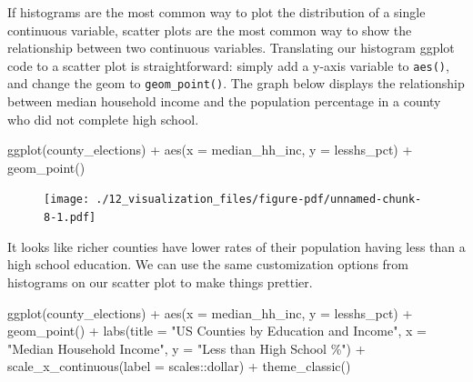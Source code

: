 \documentclass[
  letterpaper,
]{book}
\newenvironment{Shaded}{\begin{snugshade}}{\end{snugshade}}
\newcommand{\AttributeTok}[1]{\textcolor[rgb]{0.40,0.45,0.13}{#1}}
\newcommand{\FunctionTok}[1]{\textcolor[rgb]{0.28,0.35,0.67}{#1}}
\newcommand{\NormalTok}[1]{\textcolor[rgb]{0.00,0.23,0.31}{#1}}
\newcommand{\SpecialCharTok}[1]{\textcolor[rgb]{0.37,0.37,0.37}{#1}}
\newcommand{\StringTok}[1]{\textcolor[rgb]{0.13,0.47,0.30}{#1}}
\theoremstyle{definition}
\theoremstyle{definition}
\theoremstyle{plain}
\theoremstyle{definition}
\theoremstyle{plain}
\theoremstyle{plain}
\theoremstyle{remark}
\begin{document}
If histograms are the most common way to plot the distribution of a
single continuous variable, scatter plots are the most common way to
show the relationship between two continuous variables. Translating our
histogram ggplot code to a scatter plot is straightforward: simply add a
y-axis variable to \texttt{aes()}, and change the geom to
\texttt{geom\_point()}. The graph below displays the relationship
between median household income and the population percentage in a
county who did not complete high school.

\begin{Shaded}
\begin{Highlighting}[]
\FunctionTok{ggplot}\NormalTok{(county\_elections) }\SpecialCharTok{+}
  \FunctionTok{aes}\NormalTok{(}\AttributeTok{x =}\NormalTok{ median\_hh\_inc, }\AttributeTok{y =}\NormalTok{ lesshs\_pct) }\SpecialCharTok{+}
  \FunctionTok{geom\_point}\NormalTok{()}
\end{Highlighting}
\end{Shaded}

\begin{figure}[H]

{\centering \texttt{[image: ./12\_visualization\_files/figure-pdf/unnamed-chunk-8-1.pdf]}

}

\end{figure}

It looks like richer counties have lower rates of their population
having less than a high school education. We can use the same
customization options from histograms on our scatter plot to make things
prettier.

\begin{Shaded}
\begin{Highlighting}[]
\FunctionTok{ggplot}\NormalTok{(county\_elections) }\SpecialCharTok{+}
  \FunctionTok{aes}\NormalTok{(}\AttributeTok{x =}\NormalTok{ median\_hh\_inc, }\AttributeTok{y =}\NormalTok{ lesshs\_pct) }\SpecialCharTok{+}
  \FunctionTok{geom\_point}\NormalTok{() }\SpecialCharTok{+}
  \FunctionTok{labs}\NormalTok{(}\AttributeTok{title =} \StringTok{"US Counties by Education and Income"}\NormalTok{,}
       \AttributeTok{x =} \StringTok{"Median Household Income"}\NormalTok{,}
       \AttributeTok{y =} \StringTok{"Less than High School \%"}\NormalTok{) }\SpecialCharTok{+}
  \FunctionTok{scale\_x\_continuous}\NormalTok{(}\AttributeTok{label =}\NormalTok{ scales}\SpecialCharTok{::}\NormalTok{dollar) }\SpecialCharTok{+}
  \FunctionTok{theme\_classic}\NormalTok{()}
\end{Highlighting}
\end{Shaded}
\end{document}
